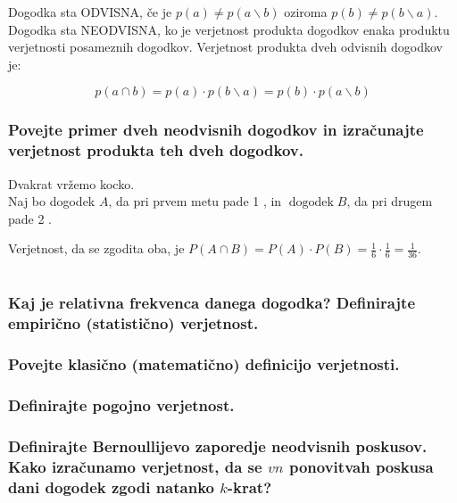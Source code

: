 \documentclass{article}
\begin{document}
Dogodka sta ODVISNA, če je $p(a) \neq p(a \backslash b)$ oziroma $p(b) \neq p(b \backslash a)$. Dogodka sta NEODVISNA, ko je verjetnost produkta dogodkov enaka produktu verjetnosti posameznih dogodkov. Verjetnost produkta dveh odvisnih dogodkov je:

$$
p(a \cap b)=p(a) \cdot p(b \backslash a)=p(b) \cdot p(a \backslash b)
$$

\subsubsection*{Povejte primer dveh neodvisnih dogodkov in izračunajte verjetnost produkta teh dveh dogodkov.}

Dvakrat vržemo kocko. \\
Naj bo dogodek $A$, da pri prvem metu pade 1 , in $\operatorname{dogodek} B$, da pri drugem pade 2 .

Verjetnost, da se zgodita oba, je $P(A \cap B)=P(A) \cdot P(B)=\frac{1}{6} \cdot \frac{1}{6}=\frac{1}{36}$.

\section{\texorpdfstring{}{Verjetnostni račun}}
\subsubsection*{Kaj je relativna frekvenca danega dogodka? Definirajte empirično (statistično) verjetnost.}



\subsubsection*{Povejte klasično (matematično) definicijo verjetnosti.}



\subsubsection*{Definirajte pogojno verjetnost.}



\subsubsection*{Definirajte Bernoullijevo zaporedje neodvisnih poskusov. Kako izračunamo verjetnost, da se $v n$ ponovitvah poskusa dani dogodek zgodi natanko $k$-krat?}
\end{document}
